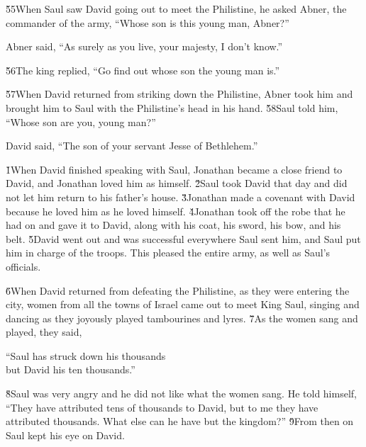 \v{55}When Saul saw David going out to meet the Philistine, he asked Abner, the commander of the army, ``Whose son is this young man, Abner?''

Abner said, ``As surely as you live, your majesty, I don't know.''

\v{56}The king replied, ``Go find out whose son the young man is.''

\v{57}When David returned from striking down the Philistine, Abner took him and brought him to Saul with the Philistine's head in his hand. \v{58}Saul told him, ``Whose son are you, young man?''

David said, ``The son of your servant Jesse of Bethlehem.''

\v{1}When David finished speaking with Saul, Jonathan became a close friend to David, and Jonathan loved him as himself. \v{2}Saul took David that day and did not let him return to his father's house. \v{3}Jonathan made a covenant with David because he loved him as he loved himself. \v{4}Jonathan took off the robe that he had on and gave it to David, along with his coat, his sword, his bow, and his belt. \v{5}David went out and was successful everywhere Saul sent him, and Saul put him in charge of the troops. This pleased the entire army, as well as Saul's officials.

\v{6}When David returned from defeating the Philistine, as they were entering the city, women from all the towns of Israel came out to meet King Saul, singing and dancing as they joyously played tambourines and lyres. \v{7}As the women sang and played, they said,

\begin{poetry}
\poeml ``Saul has struck down his thousands \\
\poemll    but David his ten thousands.''
\end{poetry}

\v{8}Saul was very angry and he did not like what the women sang. He told himself, ``They have attributed tens of thousands to David, but to me they have attributed thousands. What else can he have but the kingdom?'' \v{9}From then on Saul kept his eye on David.

